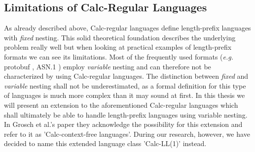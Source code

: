 \subsection{Limitations of Calc-Regular Languages}
\label{2.3}
As already described above, Calc-regular languages define length-prefix languages with \textit{fixed} nesting.
This solid theoretical foundation describes the underlying problem really well but when looking at practical examples of length-prefix formats we can see its limitations. Most of the frequently used formats (\textit{e.g.} protobuf \cite{google-protobuf-encoding}, ASN.1 \cite{ASN.1}) employ \textit{variable} nesting and can therefore not be characterized by using Calc-regular languages. The distinction between \textit{fixed} and \textit{variable} nesting shall not be underestimated, as a formal definition for this type of languages is much more complex than it may sound at first. In this thesis we will present an extension to the aforementioned Calc-regular languages which shall ultimately be able to handle length-prefix languages using variable nesting.
In Grosch et al.'s paper \cite{Calc-regular-paper} they acknowledge the possibility for this extension and refer to it as 'Calc-context-free languages'. During our research, however, we have decided to name this extended language class 'Calc-LL(1)' instead.
